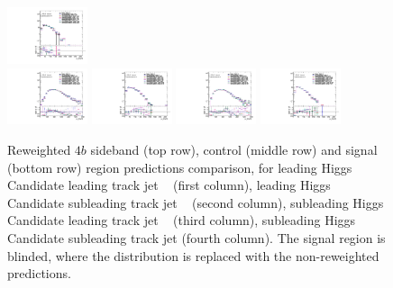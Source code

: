 \begin{figure}[htbp!]
\begin{center}
\includegraphics[width=0.21\textwidth,angle=-90]{figures/boosted/AppendixReweight/Compare/Data_FourTag_Control_directcompare_sublHCand_trk1_Pt_1.pdf}\\
\includegraphics[width=0.21\textwidth,angle=-90]{figures/boosted/AppendixReweight/Compare/Data_FourTag_Signal_directcompare_leadHCand_trk0_Pt_1.pdf}
\includegraphics[width=0.21\textwidth,angle=-90]{figures/boosted/AppendixReweight/Compare/Data_FourTag_Signal_directcompare_leadHCand_trk1_Pt_1.pdf}
\includegraphics[width=0.21\textwidth,angle=-90]{figures/boosted/AppendixReweight/Compare/Data_FourTag_Signal_directcompare_sublHCand_trk0_Pt_1.pdf}
\includegraphics[width=0.21\textwidth,angle=-90]{figures/boosted/AppendixReweight/Compare/Data_FourTag_Signal_directcompare_sublHCand_trk1_Pt_1.pdf}\\
\caption{Reweighted $4b$ sideband (top row), control (middle row) and signal (bottom row) region predictions comparison, for leading Higgs Candidate leading track jet \pt~ (first column),  leading Higgs Candidate subleading track jet \pt~ (second column), subleading Higgs Candidate leading track jet \pt~ (third column), subleading Higgs Candidate subleading track jet \pt (fourth column). The signal region is blinded, where the distribution is replaced with the non-reweighted predictions.}
\label{fig:app-rw-comp-4b-trkjet}
\end{center}
\end{figure}


